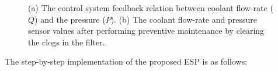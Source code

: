 \documentclass[conference]{IEEEtran}
\begin{document}
\begin{figure}[t]
    \centering
    \hfill
    \caption{(a) The control system feedback relation between coolant flow-rate ($Q$) and the pressure ($P$). (b) The coolant flow-rate and pressure sensor values after performing preventive maintenance by clearing the clogs in the filter.}
\end{figure}
The step-by-step implementation of the proposed ESP is as follows:
\end{document}
